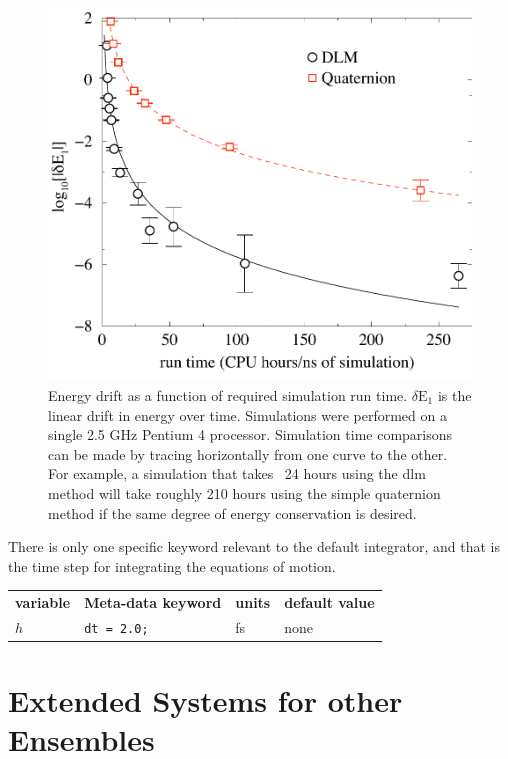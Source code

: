 \documentclass[]{book}
\begin{document}
\begin{figure}
\centering
\includegraphics[width=\linewidth]{compCost.pdf}
\caption[Energy drift as a function of required simulation run 
time]{Energy drift as a function of required simulation run time.
$\delta \mathrm{E}_1$ is the linear drift in energy over time.
Simulations were performed on a single 2.5 GHz Pentium 4
processor. Simulation time comparisons can be made by tracing
horizontally from one curve to the other. For example, a simulation
that takes ~24 hours using the {\sc dlm} method will take roughly 210
hours using the simple quaternion method if the same degree of energy
conservation is desired.}
\label{cpuCost}
\end{figure}

There is only one specific keyword relevant to the default integrator,
and that is the time step for integrating the equations of motion.

\begin{center}
\begin{tabular}{llll}
\textbf{variable} & \textbf{Meta-data keyword} & \textbf{units} &
                                                                  \textbf{default value} \\
$h$ & {\tt dt = 2.0;} & fs & none 
\end{tabular}
\end{center}

\section{\label{sec:extended}Extended Systems for other Ensembles}
\end{document}

